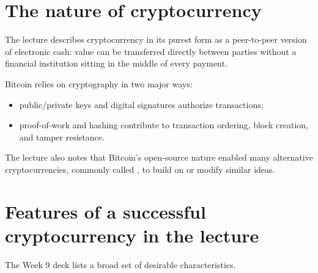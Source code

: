 \section{The nature of cryptocurrency}

The lecture describes cryptocurrency in its purest form as a peer-to-peer version of electronic cash: value can be transferred directly between parties without a financial institution sitting in the middle of every payment.

Bitcoin relies on cryptography in two major ways:

\begin{itemize}
  \item public/private keys and digital signatures authorize transactions;
  \item proof-of-work and hashing contribute to transaction ordering, block creation, and tamper resistance.
\end{itemize}

The lecture also notes that Bitcoin's open-source nature enabled many alternative cryptocurrencies, commonly called , to build on or modify similar ideas.

\section{Features of a successful cryptocurrency in the lecture}

The Week 9 deck lists a broad set of desirable characteristics.

